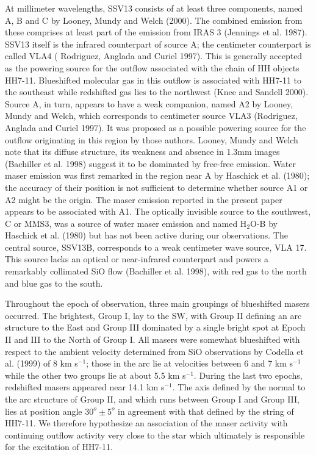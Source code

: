 	At millimeter wavelengths, SSV13 consists of at least three components, named A, B and C by Looney, Mundy and Welch (2000).  The combined emission from these comprises at least part of
the emission from IRAS 3 (Jennings et al. 1987).  SSV13 itself is the infrared counterpart of source A; the centimeter counterpart is called VLA4 ( Rodriguez, Anglada and Curiel 1997).  This is generally accepted as the powering source for the outflow associated with the chain of HH objects HH7-11.  Blueshifted molecular gas in this outflow is associated with HH7-11 to the southeast while redshifted gas lies to the northwest (Knee and Sandell 2000). Source A, in turn, appears to  have a weak companion, named A2 by Looney, Mundy and Welch, which corresponds to centimeter source VLA3 (Rodriguez, Anglada and Curiel 1997).  It was proposed as a possible powering source for the outflow originating in this region by those authors. Looney, Mundy and Welch note  that its diffuse structure, its weakness and absence in 1.3mm images  (Bachiller et al. 1998) suggest it to be dominated by free-free emission. Water maser emission was first remarked in the region near A by Haschick et al. (1980); the accuracy of their position is not sufficient to determine whether source A1 or A2 might be the origin. The maser emission reported in the present paper appears to be associated with A1. The optically invisible source to the southwest, C or MMS3, was a source of water maser emission and named H$_2$O-B by Haschick et al. (1980) but has not been active during our observations. The central source, SSV13B, corresponds to a weak centimeter wave source, VLA 17.  This source lacks an optical or near-infrared counterpart and powers a remarkably collimated SiO flow (Bachiller et al. 1998), with red gas to the north and blue gas to the south.

	Throughout the epoch of observation, three main groupings of blueshifted masers occurred. The brightest, Group I, lay to the SW, with Group II defining an arc structure  to the East and Group III dominated by a single bright spot at Epoch II and III to the North of Group I.  All masers were somewhat blueshifted with respect to the ambient velocity determined from SiO observations by Codella et al. (1999) of 8 km s$^{-1}$; those in the arc lie at velocities between 6 and 7 km s$^{-1}$ while the other two groups lie at about  5.5 km s$^{-1}$.  During the last two epochs, redshifted masers appeared near 14.1 km s$^{-1}$.  The axis defined by the normal to the arc structure of Group II, and which runs between Group I and Group III, lies at position angle $30^o \pm  5^o$ in agreement with that defined by the string of HH7-11.  We therefore hypothesize an association of the maser activity with continuing  outflow activity very close to the star which ultimately is responsible for the excitation of HH7-11.

